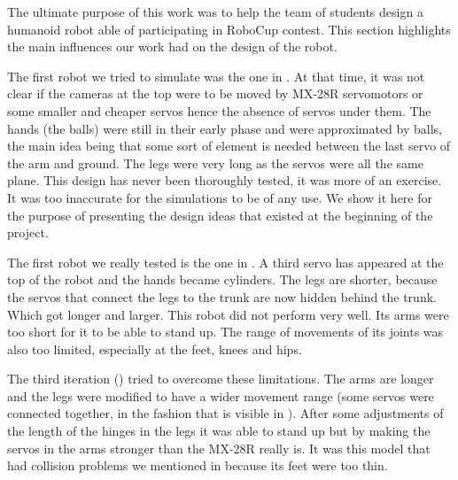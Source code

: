 The ultimate purpose of this work was to help the team of students design a humanoid robot able of participating in RoboCup contest. This section highlights the main influences our work had on the design of the robot.

The first robot we tried to simulate was the one in . At that time, it was not clear if the cameras at the top were to be moved by MX-28R servomotors or some smaller and cheaper servos hence the absence of servos under them. The hands (the balls) were still in their early phase and were approximated by balls, the main idea being that some sort of element is needed between the last servo of the arm and ground. The legs were very long as the servos were all the same plane. This design has never been thoroughly tested, it was more of an exercise. It was too inaccurate for the simulations to be of any use. We show it here for the purpose of presenting the design ideas that existed at the beginning of the project.

The first robot we really tested is the one in . A third servo has appeared at the top of the robot and the hands became cylinders. The legs are shorter, because the servos that connect the legs to the trunk are now hidden behind the trunk. Which got longer and larger. This robot did not perform very well. Its arms were too short for it to be able to stand up. The range of movements of its joints was also too limited, especially at the feet, knees and hips. 

The third iteration () tried to overcome these limitations. The arms are longer and the legs were modified to have a wider movement range (some servos were connected together, in the fashion that is visible in ). After some adjustments of the length of the hinges in the legs it was able to stand up but by making the servos in the arms stronger than the MX-28R really is. It was this model that had collision problems we mentioned in  because its feet were too thin. 

